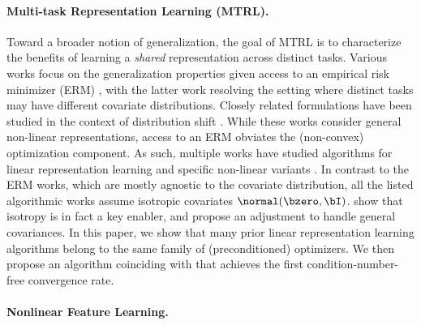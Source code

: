 \paragraph{Multi-task Representation Learning (MTRL).} Toward a broader notion of generalization, the goal of MTRL is to characterize the benefits of learning a \emph{shared} representation across distinct tasks. Various works focus on the generalization properties given access to an empirical risk minimizer (ERM) \cite{maurer2016benefit, du2020few, tripuraneni2020theory, zhang2024guarantees}, with the latter work resolving the setting where distinct tasks may have different covariate distributions. Closely related formulations have been studied in the context of distribution shift \cite{kumar2022fine, lee2023surgical}. While these works consider general non-linear representations, access to an ERM obviates the (non-convex) optimization component. As such, multiple works have studied algorithms for linear representation learning \cite{tripuraneni2021provable, collins2021exploiting, thekumparampil2021sample, nayer2022fast} and specific non-linear variants \cite{collins2024provable, nakhleh2024effects}. In contrast to the ERM works, which are mostly agnostic to the covariate distribution, all the listed algorithmic works assume isotropic covariates $\normal(\bzero, \bI)$. \citet{zhang2023meta} show that isotropy is in fact a key enabler, and propose an adjustment to handle general covariances. In this paper, we show that many prior linear representation learning algorithms belong to the same family of (preconditioned) optimizers. We then propose an algorithm coinciding with \KFAC that achieves the first condition-number-free convergence rate.


\paragraph{Nonlinear Feature Learning.} 


